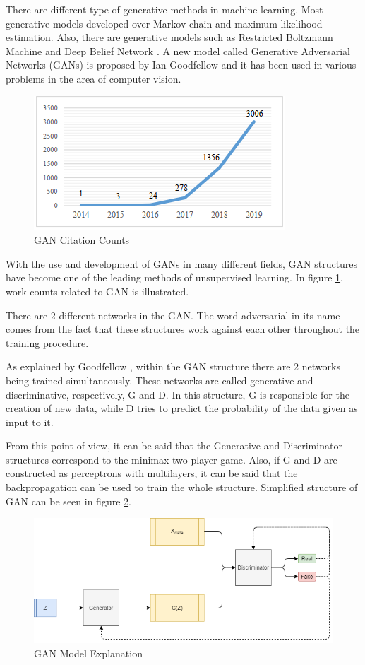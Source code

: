 There are different type of generative methods in machine learning. Most generative models developed over Markov chain and maximum likelihood estimation. Also, there are generative models such as Restricted Boltzmann Machine \cite{Boltzman} and Deep Belief Network \cite{deepbelief}.  A new model called Generative Adversarial Networks (GANs) is proposed by Ian Goodfellow \cite{gan} and it has been used in various problems in the area of computer vision.

\begin{figure}[h]
    \centering
    \includegraphics{figures/chapter3/gan-references-over-years.png}
    \caption{GAN Citation Counts}
    \label{fig:gancount}
\end{figure}

With the use and development of GANs in many different fields, GAN structures have become one of the leading methods of unsupervised learning. In figure \ref{fig:gancount}, work counts related to GAN is illustrated.

There are 2 different networks in the GAN. The word adversarial in its name comes from the fact that these structures work against each other throughout the training procedure.

As explained by Goodfellow \cite{gan}, within the GAN structure there are 2 networks being trained simultaneously. These networks are called generative and discriminative, respectively, G and D. In this structure, G is responsible for the creation of new data, while D tries to predict the probability of the data given as input to it.

From this point of view, it can be said that the Generative and Discriminator structures correspond to the minimax two-player game. Also, if G and D are constructed as perceptrons with multilayers, it can be said that the backpropagation can be used to train the whole structure. Simplified structure of GAN can be seen in figure \ref{fig:ganstruct}.

\begin{figure}[h]
    \centering
    \includegraphics[scale=0.55]{figures/chapter3/GAN.png}
    \caption{GAN Model Explanation}
    \label{fig:ganstruct}
\end{figure}

